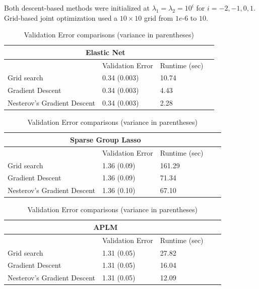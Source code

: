 \documentclass[10pt,letterpaper]{article}
\begin{document}
Both descent-based methods were initialized at $\lambda_1 = \lambda_2 = 10^i$ for $i=-2, -1, 0, 1$. Grid-based joint optimization used a $10 \times 10$ grid from $1e\text{-}6$ to $10$.


\begin{table} 
\begin{center}

\begin{tabular}{| l | l | l | l | }
\hline
\multicolumn{3}{|c|}{Elastic Net}\\
\hline
 & Validation Error & Runtime (sec) \\
\hline
Grid search & 0.34 (0.003) & 10.74\\
\hline
Gradient Descent & 0.34 (0.003) & 4.43 \\
\hline
Nesterov's Gradient Descent & 0.34 (0.003) & 2.28 \\
\hline
\end{tabular}


\begin{tabular}{| l | l | l | l | l | }
\hline
\multicolumn{3}{|c|}{Sparse Group Lasso}\\
\hline
 & Validation Error & Runtime (sec) \\
\hline
Grid search & 1.36 (0.09) & 161.29 \\
\hline
Gradient Descent  & 1.36 (0.09) & 71.34 \\
\hline
Nesterov's Gradient Descent  & 1.36 (0.10) & 67.10 \\
\hline
\end{tabular}

\begin{tabular}{| l | l | l | l | l | }
\hline
\multicolumn{3}{|c|}{APLM}\\
\hline
 & Validation Error & Runtime (sec) \\
\hline
Grid search  & 1.31 (0.05) & 27.82 \\
\hline
Gradient Descent  & 1.31 (0.05) & 16.04 \\
\hline
Nesterov's Gradient Descent  & 1.31 (0.05) & 12.09 \\
\hline
\end{tabular}

\end{center}
\caption {Validation Error comparisons (variance in parentheses)}
\label{table:validation}
\end{table}
\end{document}

